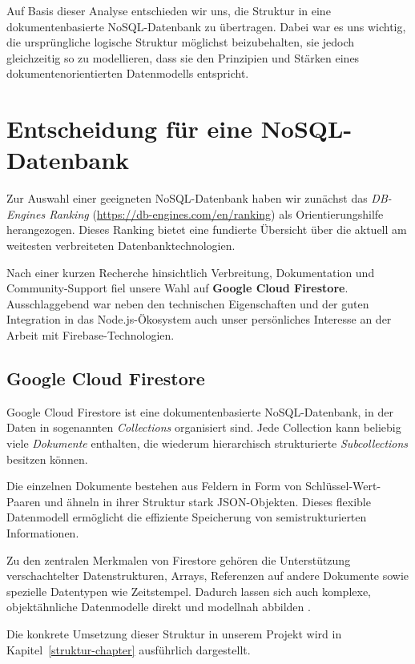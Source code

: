 \documentclass[12pt,a4paper%
              ,oneside     %
              ,titlepage
              ,DIV=13
              ,headinclude
              ,footinclude=false%
              ,cleardoublepage=empty%
              ,parskip=half,
              BCOR=0mm,
              ]{scrreprt}
\begin{document}
Auf Basis dieser Analyse entschieden wir uns, die Struktur in eine dokumentenbasierte NoSQL-Datenbank zu übertragen. Dabei war es uns wichtig, die ursprüngliche logische Struktur möglichst beizubehalten, sie jedoch gleichzeitig so zu modellieren, dass sie den Prinzipien und Stärken eines dokumentenorientierten Datenmodells entspricht.

\chapter{Entscheidung für eine NoSQL-Datenbank}

Zur Auswahl einer geeigneten NoSQL-Datenbank haben wir zunächst das \textit{DB-Engines Ranking} (\url{https://db-engines.com/en/ranking}) als Orientierungshilfe herangezogen. Dieses Ranking bietet eine fundierte Übersicht über die aktuell am weitesten verbreiteten Datenbanktechnologien.

Nach einer kurzen Recherche hinsichtlich Verbreitung, Dokumentation und Community-Support fiel unsere Wahl auf \textbf{Google Cloud Firestore}. Ausschlaggebend war neben den technischen Eigenschaften und der guten Integration in das Node.js-Ökosystem auch unser persönliches Interesse an der Arbeit mit Firebase-Technologien.

\section{Google Cloud Firestore}

Google Cloud Firestore ist eine dokumentenbasierte NoSQL-Datenbank, in der Daten in sogenannten \textit{Collections} organisiert sind. Jede Collection kann beliebig viele \textit{Dokumente} enthalten, die wiederum hierarchisch strukturierte \textit{Subcollections} besitzen können. 

Die einzelnen Dokumente bestehen aus Feldern in Form von Schlüssel-Wert-Paaren und ähneln in ihrer Struktur stark JSON-Objekten. Dieses flexible Datenmodell ermöglicht die effiziente Speicherung von semistrukturierten Informationen.

Zu den zentralen Merkmalen von Firestore gehören die Unterstützung verschachtelter Datenstrukturen, Arrays, Referenzen auf andere Dokumente sowie spezielle Datentypen wie Zeitstempel. Dadurch lassen sich auch komplexe, objektähnliche Datenmodelle direkt und modellnah abbilden \cite{Kesavan.2023, Firebase.2025, FirebaseDatenmodell.2025}.

Die konkrete Umsetzung dieser Struktur in unserem Projekt wird in Kapitel~\ref{struktur-chapter} ausführlich dargestellt.
\end{document}
